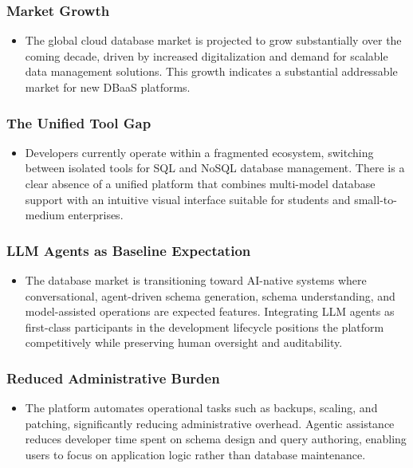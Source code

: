 \subsubsection*{Market Growth}
\begin{itemize}
    \item The global cloud database market is projected to grow substantially over the coming decade, driven by increased digitalization and demand for scalable data management solutions. This growth indicates a substantial addressable market for new DBaaS platforms.
\end{itemize}

\subsubsection*{The Unified Tool Gap}
\begin{itemize}
    \item Developers currently operate within a fragmented ecosystem, switching between isolated tools for SQL and NoSQL database management. There is a clear absence of a unified platform that combines multi-model database support with an intuitive visual interface suitable for students and small-to-medium enterprises.
\end{itemize}

\subsubsection*{LLM Agents as Baseline Expectation}
\begin{itemize}
    \item The database market is transitioning toward AI-native systems where conversational, agent-driven schema generation, schema understanding, and model-assisted operations are expected features. Integrating LLM agents as first-class participants in the development lifecycle positions the platform competitively while preserving human oversight and auditability.
\end{itemize}

\subsubsection*{Reduced Administrative Burden}
\begin{itemize}
    \item The platform automates operational tasks such as backups, scaling, and patching, significantly reducing administrative overhead. Agentic assistance reduces developer time spent on schema design and query authoring, enabling users to focus on application logic rather than database maintenance.
\end{itemize}
